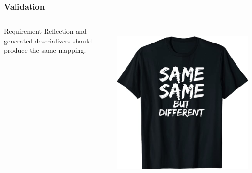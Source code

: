 \documentclass{beamer}
\begin{document}
    \begin{frame}
        \frametitle{Validation}
        \begin{columns} %
            \begin{column}{.48\textwidth}
                \begin{block}{Requirement}
                    Reflection and generated deserializers should produce the same mapping.
                \end{block}
            \end{column}
            \begin{column}{.4\textwidth}
                \\[0.45cm]
                \includegraphics[width=\textwidth]{images/same-same}
            \end{column}
        \end{columns}
    \end{frame}
\end{document}
